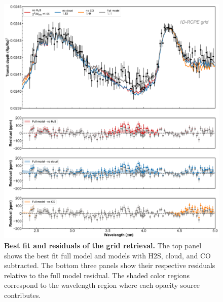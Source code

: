 \documentclass[sn-standardnature]{sn-jnl}%
\begin{document}
\begin{figure}
\centering
  \includegraphics[width=\textwidth,keepaspectratio]{figs/SI_Fig2.png}
  \caption{\textbf{Best fit and residuals of the grid retrieval.} The top panel shows the best fit full model and models with H$2$S, cloud, and CO subtracted. The bottom three panels show their respective residuals relative to the full model residual. The shaded color regions correspond to the wavelength region where each opacity source contributes.}
  \label{fig:new_residual_grid}
\end{figure}
\end{document}
